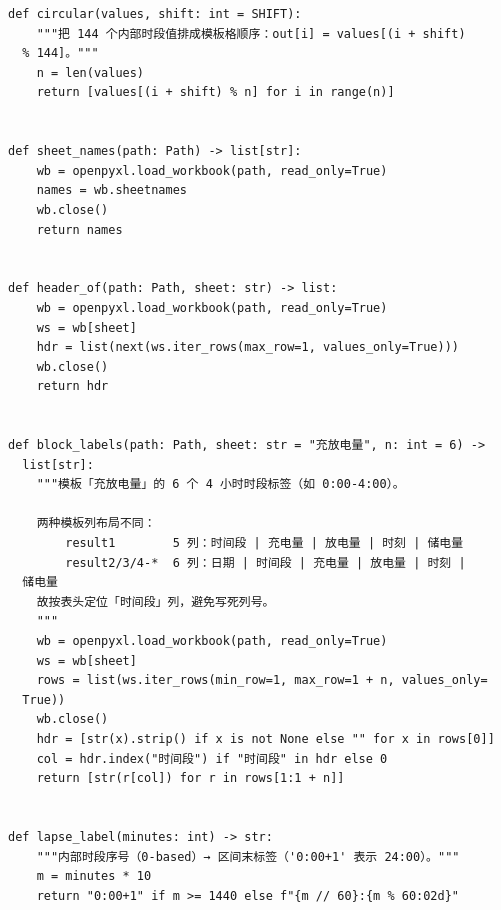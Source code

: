 \begin{verbatim}
def circular(values, shift: int = SHIFT):
    """把 144 个内部时段值排成模板格顺序：out[i] = values[(i + shift)
  % 144]。"""
    n = len(values)
    return [values[(i + shift) % n] for i in range(n)]


def sheet_names(path: Path) -> list[str]:
    wb = openpyxl.load_workbook(path, read_only=True)
    names = wb.sheetnames
    wb.close()
    return names


def header_of(path: Path, sheet: str) -> list:
    wb = openpyxl.load_workbook(path, read_only=True)
    ws = wb[sheet]
    hdr = list(next(ws.iter_rows(max_row=1, values_only=True)))
    wb.close()
    return hdr


def block_labels(path: Path, sheet: str = "充放电量", n: int = 6) ->
  list[str]:
    """模板「充放电量」的 6 个 4 小时时段标签（如 0:00-4:00）。

    两种模板列布局不同：
        result1        5 列：时间段 | 充电量 | 放电量 | 时刻 | 储电量
        result2/3/4-*  6 列：日期 | 时间段 | 充电量 | 放电量 | 时刻 |
  储电量
    故按表头定位「时间段」列，避免写死列号。
    """
    wb = openpyxl.load_workbook(path, read_only=True)
    ws = wb[sheet]
    rows = list(ws.iter_rows(min_row=1, max_row=1 + n, values_only=
  True))
    wb.close()
    hdr = [str(x).strip() if x is not None else "" for x in rows[0]]
    col = hdr.index("时间段") if "时间段" in hdr else 0
    return [str(r[col]) for r in rows[1:1 + n]]


def lapse_label(minutes: int) -> str:
    """内部时段序号（0-based）→ 区间末标签（'0:00+1' 表示 24:00）。"""
    m = minutes * 10
    return "0:00+1" if m >= 1440 else f"{m // 60}:{m % 60:02d}"
\end{verbatim}

\endgroup